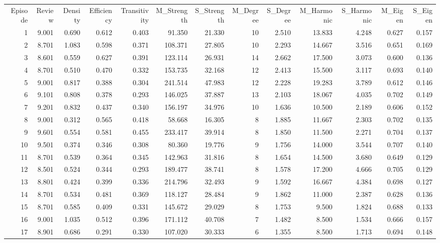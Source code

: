 \begin{tabular}{rrrrrrrrrrrrr}
Episode & Review & Density & Efficiency & Transitivity & M_Strength & S_Strength & M_Degree & S_Degree & M_Harmonic & S_Harmonic & M_Eigen & S_Eigen \\
1 & 9.001 & 0.690 & 0.612 & 0.403 & 91.350 & 21.330 & 10 & 2.510 & 13.833 & 4.248 & 0.627 & 0.157 \\
2 & 8.701 & 1.083 & 0.598 & 0.371 & 108.371 & 27.805 & 10 & 2.293 & 14.667 & 3.516 & 0.651 & 0.169 \\
3 & 8.601 & 0.559 & 0.627 & 0.391 & 123.114 & 26.931 & 14 & 2.662 & 17.500 & 3.073 & 0.600 & 0.136 \\
4 & 8.701 & 0.510 & 0.470 & 0.332 & 153.735 & 32.168 & 12 & 2.413 & 15.500 & 3.117 & 0.693 & 0.140 \\
5 & 9.001 & 0.817 & 0.388 & 0.304 & 241.514 & 47.983 & 12 & 2.228 & 19.283 & 3.789 & 0.612 & 0.146 \\
6 & 9.101 & 0.808 & 0.378 & 0.293 & 146.025 & 37.887 & 13 & 2.103 & 18.067 & 4.035 & 0.702 & 0.149 \\
7 & 9.201 & 0.832 & 0.437 & 0.340 & 156.197 & 34.976 & 10 & 1.636 & 10.500 & 2.189 & 0.606 & 0.152 \\
8 & 9.001 & 0.312 & 0.565 & 0.418 & 58.668 & 16.305 & 8 & 1.885 & 11.667 & 2.303 & 0.702 & 0.135 \\
9 & 9.601 & 0.554 & 0.581 & 0.455 & 233.417 & 39.914 & 8 & 1.850 & 11.500 & 2.271 & 0.704 & 0.137 \\
10 & 9.501 & 0.374 & 0.346 & 0.308 & 80.360 & 19.776 & 9 & 1.756 & 14.000 & 3.544 & 0.707 & 0.140 \\
11 & 8.701 & 0.539 & 0.364 & 0.345 & 142.963 & 31.816 & 8 & 1.654 & 14.500 & 3.680 & 0.649 & 0.129 \\
12 & 8.501 & 0.524 & 0.344 & 0.293 & 189.477 & 38.741 & 8 & 1.578 & 17.200 & 4.666 & 0.705 & 0.129 \\
13 & 8.801 & 0.424 & 0.399 & 0.336 & 214.796 & 32.493 & 9 & 1.592 & 16.667 & 4.384 & 0.698 & 0.127 \\
14 & 8.701 & 0.534 & 0.481 & 0.369 & 118.127 & 28.484 & 9 & 1.862 & 11.000 & 2.387 & 0.628 & 0.136 \\
15 & 8.701 & 0.585 & 0.409 & 0.331 & 145.672 & 29.029 & 8 & 1.753 & 9.500 & 1.824 & 0.688 & 0.133 \\
16 & 9.001 & 1.035 & 0.512 & 0.396 & 171.112 & 40.708 & 7 & 1.482 & 8.500 & 1.534 & 0.666 & 0.157 \\
17 & 8.901 & 0.686 & 0.291 & 0.330 & 107.020 & 30.333 & 6 & 1.355 & 8.500 & 1.713 & 0.694 & 0.148 \\

\end{tabular}
